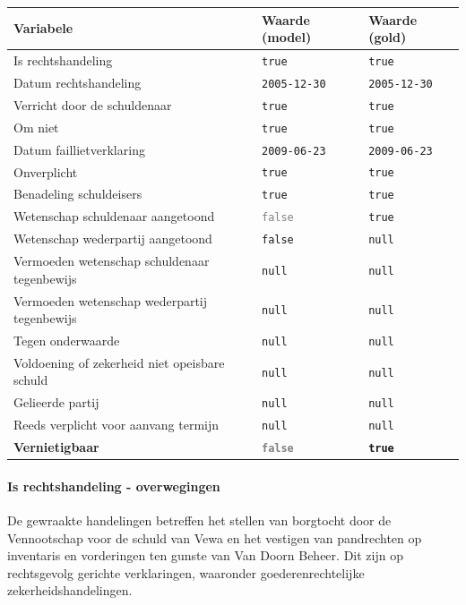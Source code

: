 \documentclass[
  dutch,
  a4paper,
]{article}
\begin{document}
\begin{center}
\small
\begin{tabular}{@{}p{7.4cm}p{2.6cm}p{2.6cm}@{}}
\toprule
Variabele & Waarde (model) & Waarde (gold) \\
\midrule
Is rechtshandeling & \texttt{true} & \texttt{true} \\
Datum rechtshandeling & \texttt{2005-12-30} & \texttt{2005-12-30} \\
Verricht door de schuldenaar & \texttt{true} & \texttt{true} \\
Om niet & \texttt{true} & \texttt{true} \\
Datum faillietverklaring & \texttt{2009-06-23} & \texttt{2009-06-23} \\
Onverplicht & \texttt{true} & \texttt{true} \\
Benadeling schuldeisers & \texttt{true} & \texttt{true} \\
Wetenschap schuldenaar aangetoond & \textcolor{gray}{\texttt{false}} & \texttt{true} \\
Wetenschap wederpartij aangetoond & \texttt{false} & \texttt{null} \\
Vermoeden wetenschap schuldenaar tegenbewijs & \texttt{null} & \texttt{null} \\
Vermoeden wetenschap wederpartij tegenbewijs & \texttt{null} & \texttt{null} \\
Tegen onderwaarde & \texttt{null} & \texttt{null} \\
Voldoening of zekerheid niet opeisbare schuld & \texttt{null} & \texttt{null} \\
Gelieerde partij & \texttt{null} & \texttt{null} \\
Reeds verplicht voor aanvang termijn & \texttt{null} & \texttt{null} \\
\textbf{Vernietigbaar} & \textbf{\textcolor{gray}{\texttt{false}}} & \textbf{\texttt{true}} \\
\bottomrule
\end{tabular}
\end{center}

\paragraph{Is rechtshandeling - overwegingen}\label{is-rechtshandeling---overwegingen-1}

De gewraakte handelingen betreffen het stellen van borgtocht door de Vennootschap voor de schuld van Vewa en het vestigen van pandrechten op inventaris en vorderingen ten gunste van Van Doorn Beheer. Dit zijn op rechtsgevolg gerichte verklaringen, waaronder goederenrechtelijke zekerheidshandelingen.
\end{document}
